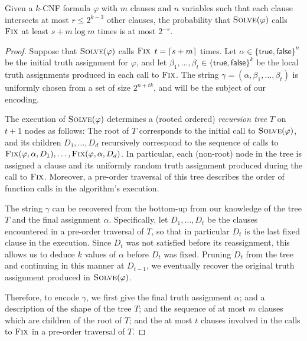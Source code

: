 \documentclass{patmorin}
\begin{document}
\begin{thm}
%
  Given a $k$-CNF formula $\varphi$ with $m$ clauses and $n$ variables
  such that each clause intersects at most $r \le 2^{k - 3}$ other
  clauses, the probability that $\textsc{Solve}(\varphi)$ calls
  $\textsc{Fix}$ at least $s + m \log m$ times is at most $2^{-s}$.
\end{thm}
\begin{proof}
  Suppose that $\textsc{Solve}(\varphi)$ calls $\textsc{Fix}$
  $t = {\lceil s + m \rceil}$ times. Let
  $\alpha \in \{\textsf{true}, \textsf{false}\}^n$ be the initial
  truth assignment for $\varphi$, and let
  $\beta_1, \ldots, \beta_t \in \{\textsf{true}, \textsf{false}\}^k$
  be the local truth assignments produced in each call to
  $\textsc{Fix}$. The string
  $\gamma = (\alpha, \beta_1, \ldots, \beta_t)$ is uniformly chosen
  from a set of size $2^{n + tk}$, and will be the subject of our
  encoding.

  The execution of $\textsc{Solve}(\varphi)$ determines a (rooted
  ordered) \emph{recursion tree} $T$ on $t + 1$ nodes as follows: The
  root of $T$ corresponds to the initial call to
  $\textsc{Solve}(\varphi)$, and its children $D_1, \ldots, D_d$
  recursively correspond to the sequence of calls to
  $\textsc{Fix}(\varphi, \alpha, D_1), \ldots, \textsc{Fix}(\varphi,
  \alpha, D_d)$. In particular, each (non-root) node in the tree is
  assigned a clause and its uniformly random truth assignment produced
  during the call to $\textsc{Fix}$. Moreover, a pre-order traversal
  of this tree describes the order of function calls in the
  algorithm's execution.

  The string $\gamma$ can be recovered from the bottom-up from our
  knowledge of the tree $T$ and the final assignment
  $\alpha$. Specifically, let $D_1, \dots, D_t$ be the clauses
  encountered in a pre-order traversal of $T$, so that in particular
  $D_t$ is the last fixed clause in the execution. Since $D_t$ was not
  satisfied before its reassignment, this allows us to deduce $k$
  values of $\alpha$ before $D_t$ was fixed. Pruning $D_t$ from the
  tree and continuing in this manner at $D_{t - 1}$, we eventually
  recover the original truth assignment produced in
  $\textsc{Solve}(\varphi)$.

  Therefore, to encode $\gamma$, we first give the final truth
  assignment $\alpha$; and a description of the shape of the tree $T$;
  and the sequence of at most $m$ clauses which are children of the
  root of $T$; and the at most $t$ clauses involved in the calls to
  $\textsc{Fix}$ in a pre-order traversal of $T$.


\end{proof}
\end{document}
